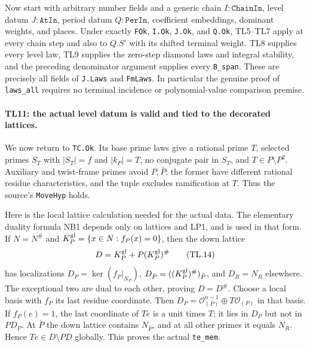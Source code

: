 \documentclass[11pt,a4paper]{article}
\numberwithin{equation}{section}
\theoremstyle{remark}\newtheorem{remark}[theorem]{Remark}
\begin{document}
Now start with arbitrary number fields and a generic chain
$I:\texttt{ChainIn}$, level datum $J:\texttt{AtIn}$, period datum
$Q:\texttt{PerIn}$, coefficient embeddings, dominant weights, and
places. Under exactly \texttt{FOk}, \texttt{I.Ok}, \texttt{J.Ok},
and \texttt{Q.Ok}, TL5--TL7 apply at every chain step and also to
$Q.S'$ with its shifted terminal weight. TL8 supplies every level
law, TL9 supplies the zero-step diamond laws and integral stability,
and the preceding denominator argument supplies every
\texttt{B\_\allowbreak span}. These are precisely all fields of
\texttt{J.Laws} and \texttt{FmLaws}. In particular the genuine
proof of \texttt{laws\_\allowbreak all} requires no terminal incidence or
polynomial-value comparison premise.

\paragraph{TL11: the actual level datum is valid and tied to the
decorated lattices.}
We now return to \texttt{TC.Ok}. Its base prime laws give a rational
prime $T$, selected primes $S_T$ with $|S_T|=f$ and $|k_P|=T$,
no conjugate pair in $S_T$, and $T\in P\setminus P^2$.
Auxiliary and twist-frame primes avoid $P,\bar P$: the former have
different rational residue characteristics, and the tuple excludes
ramification at $T$. Thus the source's \texttt{MoveHyp} holds.

Here is the local lattice calculation needed for the actual data.
The elementary duality formula NB1 depends only on lattices and
LP1, and is used in that form. If $N=N^\#$ and
$K_P^{\rm gl}=\{x\in N:f_P(x)=0\}$, then the down lattice
\[
 D=K_P^{\rm gl}+P(K_P^{\rm gl})^\#                \tag{TL.14}
\]
has localizations $D_P=\ker(f_P|_{N_P})$,
$D_{\bar P}=((K_P^{\rm gl})^\#)_{\bar P}$, and $D_R=N_R$ elsewhere.
The exceptional two are dual to each other, proving $D=D^\#$.
Choose a local basis with $f_P$ its last residue coordinate. Then
$D_P=\mathcal O_{(P)}^{n-1}\oplus T\mathcal O_{(P)}$ in that basis.
If $f_P(e)=1$, the last coordinate of $Te$ is a unit times $T$;
it lies in $D_P$ but not in $PD_P$. At $\bar P$ the down lattice
contains $N_{\bar P}$, and at all other primes it equals $N_R$.
Hence $Te\in D\setminus PD$ globally. This proves the actual
\texttt{te\_\allowbreak mem}.
\end{document}
